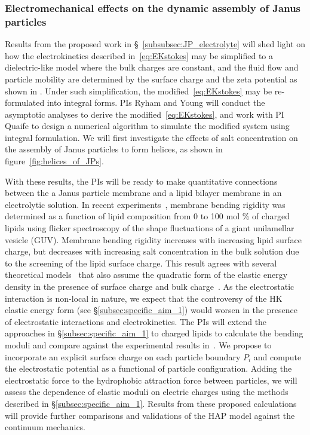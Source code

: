 \subsubsection{Electromechanical effects on the dynamic assembly of Janus particles \label{subsubsec:em_effects}}
Results from the proposed work in \S~\ref{subsubsec:JP_electrolyte} will shed light on how the electrokinetics described in~\eqref{eq:EKstokes}
may be simplified to a dielectric-like model where the bulk charges are constant, and the fluid flow and particle mobility are determined by the surface charge and the zeta potential as shown in \cite{Mori2018_JFM}. Under such simplification, the modified~\eqref{eq:EKstokes} may be re-formulated into integral forms. PIs Ryham and Young will conduct the asymptotic analyses to derive the modified~\eqref{eq:EKstokes}, and work with PI Quaife to design a numerical algorithm to simulate the modified system using integral formulation. We will first investigate the effects of salt concentration on the assembly of Janus particles to form helices, as shown in figure~\ref{fig:helices_of_JPs}.

With these results, the PIs will be ready to make quantitative connections between the a Janus particle membrane and a lipid bilayer membrane in an electrolytic solution. In recent experiments~\cite{FaizEtAl2019_SoftMatt}, membrane bending
rigidity was determined as a function of lipid composition from 0 to 100
mol $\%$ of charged lipids using flicker spectroscopy of the shape
fluctuations of a giant unilamellar vesicle (GUV).
Membrane bending rigidity increases with increasing lipid surface
charge, but decreases with increasing salt concentration in the bulk
solution due to the screening of the lipid surface charge. This
result agrees
with several theoretical models~\cite{Kralchevsky1996_JCIS,
May1996_JChemPhys, LoubetEtAl2013_PRE} that also assume the quadratic
form of the elastic energy density in the presence of surface charge and
bulk charge~\cite{DuplantierGoldstein1990_PRL, Winterhalter1992_JPC}. As
the electrostatic interaction is non-local in nature, we expect that the
controversy of the HK elastic energy form (see
\S\ref{subsec:specific_aim_1}) would worsen in the presence of
electrostatic interactions and electrokinetics. The PIs will extend the
approaches in \S\ref{subsec:specific_aim_1} to charged lipids to
calculate the bending moduli and compare against the experimental
results in~\cite{FaizEtAl2019_SoftMatt}. We propose to incorporate an
explicit surface charge on each particle boundary $P_i$ and compute the
electrostatic potential as a functional of particle configuration.
Adding the electrostatic force to the hydrophobic attraction force
between particles, we will assess the dependence of elastic moduli on
electric charges using the methods described in
\S\ref{subsec:specific_aim_1}. Results from these proposed calculations
will provide further comparisons and validations of the HAP model
against the continuum mechanics.

